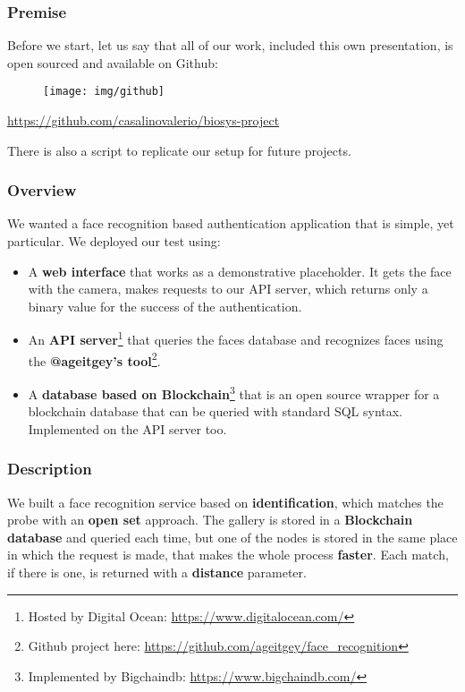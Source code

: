 \begin{frame} \frametitle{Premise}

	Before we start, let us say that all of our work, included this own
	presentation, is open sourced and available on Github:
	
	\begin{center}
		\begin{figure}[H]
			\texttt{[image: img/github]}
		\end{figure}
		{\color{red} \url{https://github.com/casalinovalerio/biosys-project}}
	\end{center}
	\vfill
	There is also a script to replicate our setup for future projects.
	
\end{frame}

\begin{frame} \frametitle{Overview}
	We wanted a face recognition based authentication application that is simple, 
	yet particular. We deployed our test using:

	\vfill
	\begin{itemize}

		\item A \textbf{web interface} that works as a 
		demonstrative placeholder. It gets the face with the camera, makes 
		requests to our API server, which returns only a binary value for the 
		success of the authentication.
	
		\item An \textbf{API server}\footnote{Hosted by Digital Ocean: 
		{\color{red} \url{https://www.digitalocean.com/}}} that queries the 
		faces database and recognizes faces using the \textbf{@ageitgey's 
		tool}\footnote{Github project here: {\color{red} 
		\url{https://github.com/ageitgey/face_recognition}}}.
	
		\item A \textbf{database based on Blockchain}\footnote{Implemented by 
		Bigchaindb: {\color{red} \url{https://www.bigchaindb.com/}}} that is an
		open source wrapper for a blockchain database that can be queried with 
		standard SQL syntax. Implemented on the API server too.
	
	\end{itemize}
	\vfill
\end{frame}

\begin{frame} \frametitle{Description}

	We built a face recognition service based on \textbf{identification}, 
	which matches the probe with an \textbf{open set} approach.
	\vfill
	The gallery is stored in a \textbf{Blockchain database} and queried each 
	time, but one of the nodes is stored in the same place in which the 
	request is made,	that makes the whole process \textbf{faster}.
	\vfill
	Each match, if there is one, is returned with a \textbf{distance} parameter.  

\end{frame}

